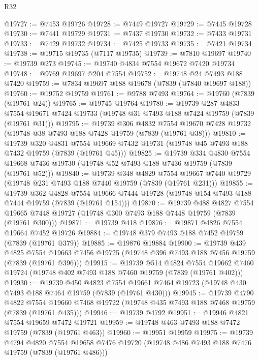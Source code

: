 \begin{lexlean}{R32}
\begin{coremodule}
@19727 := @7453 @19726
@19728 := @7449 @19727
@19729 := @7445 @19728
@19730 := @7441 @19729
@19731 := @7437 @19730
@19732 := @7433 @19731
@19733 := @7429 @19732
@19734 := @7425 @19733
@19735 := @7421 @19734
@19738 := @19715 @19735 (@7117 @19735)
@19739 := @7810 @19697
@19740 := @19739 @273
@19745 := @19740 @4834 @7554 @19672 @7420 @19734
@19748 := @9769 @19697 @204 @7554
@19752 := @19748 @24 @7493 @188 @7420
@19759 := @7834 @19697 @188 @19678 (@7839 (@7840 @19697 @188))
@19760 := @19752 @19759
@19761 := @9788 @7493
@19764 := @19760 (@7839 (@19761 @24))
@19765 := @19745 @19764
@19780 := @19739
    @287
    @4833
    @7554
    @19671
    @7424
    @19733
    (@19748 @31 @7493 @188 @7424 @19759 (@7839 (@19761 @31)))
@19795 := @19739
    @306
    @4832
    @7554
    @19670
    @7428
    @19732
    (@19748 @38 @7493 @188 @7428 @19759 (@7839 (@19761 @38)))
@19810 := @19739
    @320
    @4831
    @7554
    @19669
    @7432
    @19731
    (@19748 @45 @7493 @188 @7432 @19759 (@7839 (@19761 @45)))
@19825 := @19739
    @334
    @4830
    @7554
    @19668
    @7436
    @19730
    (@19748 @52 @7493 @188 @7436 @19759 (@7839 (@19761 @52)))
@19840 := @19739
    @348
    @4829
    @7554
    @19667
    @7440
    @19729
    (@19748 @231 @7493 @188 @7440 @19759 (@7839 (@19761 @231)))
@19855 := @19739
    @362
    @4828
    @7554
    @19666
    @7444
    @19728
    (@19748 @154 @7493 @188 @7444 @19759 (@7839 (@19761 @154)))
@19870 := @19739
    @488
    @4827
    @7554
    @19665
    @7448
    @19727
    (@19748 @300 @7493 @188 @7448 @19759 (@7839 (@19761 @300)))
@19871 := @19739 @418
@19876 := @19871 @4826 @7554 @19664 @7452 @19726
@19884 := @19748 @379 @7493 @188 @7452 @19759 (@7839 (@19761 @379))
@19885 := @19876 @19884
@19900 := @19739
    @439
    @4825
    @7554
    @19663
    @7456
    @19725
    (@19748 @396 @7493 @188 @7456 @19759 (@7839 (@19761 @396)))
@19915 := @19739
    @514
    @4824
    @7554
    @19662
    @7460
    @19724
    (@19748 @402 @7493 @188 @7460 @19759 (@7839 (@19761 @402)))
@19930 := @19739
    @450
    @4823
    @7554
    @19661
    @7464
    @19723
    (@19748 @430 @7493 @188 @7464 @19759 (@7839 (@19761 @430)))
@19945 := @19739
    @4790
    @4822
    @7554
    @19660
    @7468
    @19722
    (@19748 @435 @7493 @188 @7468 @19759 (@7839 (@19761 @435)))
@19946 := @19739 @4792
@19951 := @19946 @4821 @7554 @19659 @7472 @19721
@19959 := @19748 @463 @7493 @188 @7472 @19759 (@7839 (@19761 @463))
@19960 := @19951 @19959
@19975 := @19739
    @4794
    @4820
    @7554
    @19658
    @7476
    @19720
    (@19748 @486 @7493 @188 @7476 @19759 (@7839 (@19761 @486)))

\end{coremodule}
\end{lexlean}
